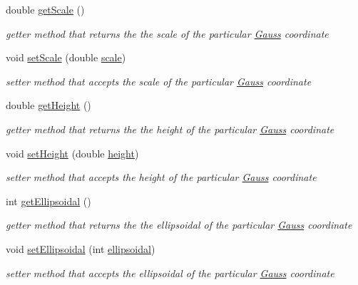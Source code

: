 \begin{DoxyCompactItemize}
double \hyperlink{classcoordinates_1_1_gauss_ab0d10005ccb914af91c8afc28d2ed836}{get\+Scale} ()
\begin{DoxyCompactList}\small\item\em getter method that returns the the scale of the particular \hyperlink{classcoordinates_1_1_gauss}{Gauss} coordinate \end{DoxyCompactList}\item 
void \hyperlink{classcoordinates_1_1_gauss_a5f0cc370abdab913a51a7395bc54ff24}{set\+Scale} (double \hyperlink{classcoordinates_1_1_gauss_aea6297c71e9258a7dfb80a823048dc0d}{scale})
\begin{DoxyCompactList}\small\item\em setter method that accepts the scale of the particular \hyperlink{classcoordinates_1_1_gauss}{Gauss} coordinate \end{DoxyCompactList}\item 
double \hyperlink{classcoordinates_1_1_gauss_a3bc39fe23752a9bccac68015c799f3fc}{get\+Height} ()
\begin{DoxyCompactList}\small\item\em getter method that returns the the height of the particular \hyperlink{classcoordinates_1_1_gauss}{Gauss} coordinate \end{DoxyCompactList}\item 
void \hyperlink{classcoordinates_1_1_gauss_a3af44a951b3cb9ea5f5cf143b1cb2253}{set\+Height} (double \hyperlink{classcoordinates_1_1_gauss_ad1543fe8a30e7f6dab1d0486bb5a935d}{height})
\begin{DoxyCompactList}\small\item\em setter method that accepts the height of the particular \hyperlink{classcoordinates_1_1_gauss}{Gauss} coordinate \end{DoxyCompactList}\item 
int \hyperlink{classcoordinates_1_1_gauss_a5c6271983e9bb69b8d024158397f5882}{get\+Ellipsoidal} ()
\begin{DoxyCompactList}\small\item\em getter method that returns the the ellipsoidal of the particular \hyperlink{classcoordinates_1_1_gauss}{Gauss} coordinate \end{DoxyCompactList}\item 
void \hyperlink{classcoordinates_1_1_gauss_a2bfa95e5913df58667cf5c15db228db8}{set\+Ellipsoidal} (int \hyperlink{classcoordinates_1_1_gauss_a08582ecf17604f8330df079ce234008c}{ellipsoidal})
\begin{DoxyCompactList}\small\item\em setter method that accepts the ellipsoidal of the particular \hyperlink{classcoordinates_1_1_gauss}{Gauss} coordinate \end{DoxyCompactList}\end{DoxyCompactItemize}
